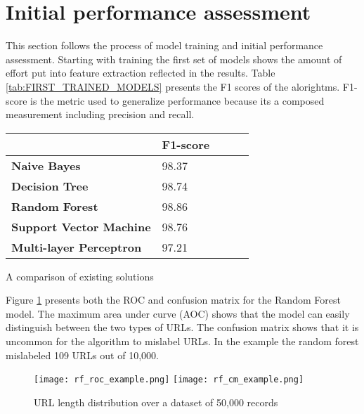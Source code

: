 \section{Initial performance assessment}
This section follows the process of model training and initial performance assessment. Starting with training the first set of models shows the amount of effort put into feature extraction reflected in the results. Table \ref{tab:FIRST_TRAINED_MODELS} presents the F1 scores of the alorightms. F1-score is the metric used to generalize performance because its a composed measurement including precision and recall.

\begin{singlespace}
	\small
	\begin{center}
		\label{tab:FIRST_TRAINED_MODELS}
		\begin{tabular}{ | m{8em} | m{13em} | m{8.5em} | m{2.3em} | m{5em} | }
			\hline
			                                & \textbf{F1-score} \\
			\hline
			\textbf{Naive Bayes}            & 98.37             \\
			\hline
			\textbf{Decision Tree}          & 98.74             \\
			\hline
			\textbf{Random Forest}          & 98.86             \\
			\hline
			\textbf{Support Vector Machine} & 98.76             \\
			\hline
			\textbf{Multi-layer Perceptron} & 97.21             \\
			\hline
		\end{tabular}
		\captionsetup{type=table}\caption{A comparison of existing solutions \citep{INTELLIGENT_PHISHING_ANFIS}}
	\end{center}
\end{singlespace}

Figure \ref{fig:ROC_CM_EXAMPLE} presents both the ROC and confusion matrix for the Random Forest model. The maximum area under curve (AOC) shows that the model can easily distinguish between the two types of URLs. The confusion matrix shows that it is uncommon for the algorithm to mislabel URLs. In the example the random forest mislabeled 109 URLs out of 10,000.

\begin{figure}[t]
	\centering
	\texttt{[image: rf\_roc\_example.png]}
	\texttt{[image: rf\_cm\_example.png]}
	\caption{URL length distribution over a dataset of 50,000 records}
	\label{fig:ROC_CM_EXAMPLE}
\end{figure}

